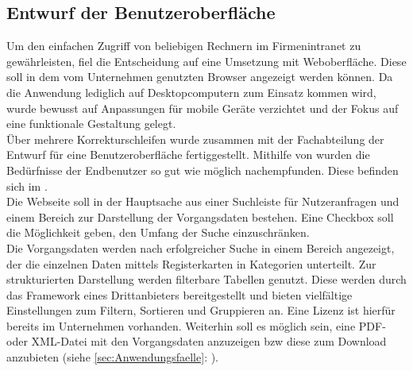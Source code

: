 \subsection{Entwurf der Benutzeroberfläche}
\label{sec:Benutzeroberflaeche} 
Um den einfachen Zugriff von beliebigen Rechnern im Firmenintranet zu gewährleisten,
fiel die Entscheidung auf eine Umsetzung mit Weboberfläche. Diese soll in dem vom Unternehmen genutzten Browser angezeigt werden können.
Da die Anwendung lediglich auf Desktopcomputern zum Einsatz kommen wird, wurde bewusst auf Anpassungen für mobile Geräte verzichtet
und der Fokus auf eine funktionale Gestaltung gelegt.\\
Über mehrere Korrekturschleifen wurde zusammen mit der Fachabteilung der Entwurf für eine Benutzeroberfläche
fertiggestellt. Mithilfe von  wurden die Bedürfnisse der Endbenutzer so gut wie möglich nachempfunden.
Diese befinden sich im .\\
Die Webseite soll in der Hauptsache aus einer Suchleiste für Nutzeranfragen und einem Bereich zur Darstellung der Vorgangsdaten
bestehen. Eine Checkbox soll die Möglichkeit geben, den Umfang der Suche einzuschränken.\\
Die Vorgangsdaten werden nach erfolgreicher Suche in einem Bereich angezeigt, der die einzelnen Daten mittels Registerkarten
in Kategorien unterteilt. Zur strukturierten Darstellung werden filterbare Tabellen genutzt. Diese werden durch das
Framework  eines Drittanbieters bereitgestellt und bieten vielfältige Einstellungen zum Filtern,
Sortieren und Gruppieren an. Eine Lizenz ist hierfür bereits im Unternehmen vorhanden.
Weiterhin soll es möglich sein, eine \acs{PDF}- oder \acs{XML}-Datei mit den Vorgangsdaten anzuzeigen \acs{bzw} diese zum 
Download anzubieten (siehe \ref{sec:Anwendungsfaelle}: ).

